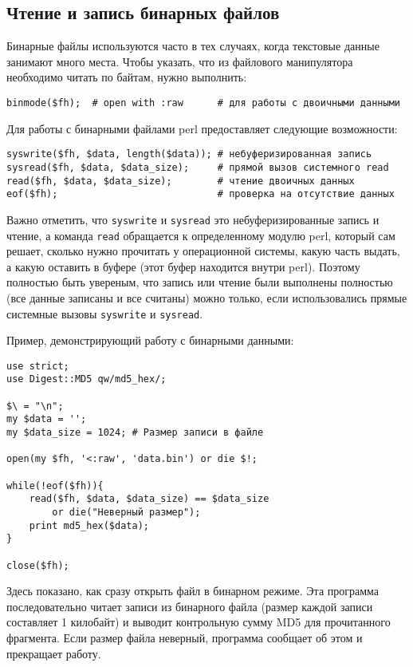 \subsection{Чтение и запись бинарных файлов}
Бинарные файлы используются часто в тех случаях, когда текстовые данные занимают много места. Чтобы указать, что из файлового манипулятора необходимо читать по байтам, нужно выполнить:
\begin{verbatim}
binmode($fh);  # open with :raw      # для работы с двоичными данными
\end{verbatim}
Для работы с бинарными файлами perl предоставляет следующие возможности:
\begin{verbatim}
syswrite($fh, $data, length($data)); # небуферизированная запись
sysread($fh, $data, $data_size);     # прямой вызов системного read
read($fh, $data, $data_size);        # чтение двоичных данных
eof($fh);                            # проверка на отсутствие данных
\end{verbatim}
Важно отметить, что \verb|syswrite| и \verb|sysread| это небуферизированные запись и чтение, а команда \verb|read| обращается к определенному модулю perl, который сам решает, сколько нужно прочитать у операционной системы, какую часть выдать, а какую оставить в буфере (этот буфер находится внутри perl). Поэтому полностью быть увереным, что запись или чтение были выполнены полностью (все данные записаны и все считаны) можно только, если использовались прямые системные вызовы \verb|syswrite| и \verb|sysread|.

Пример, демонстрирующий работу с бинарными данными:
\begin{verbatim}
use strict;
use Digest::MD5 qw/md5_hex/;

$\ = "\n";
my $data = '';
my $data_size = 1024; # Размер записи в файле

open(my $fh, '<:raw', 'data.bin') or die $!;

while(!eof($fh)){
    read($fh, $data, $data_size) == $data_size
        or die("Неверный размер");
    print md5_hex($data);
}

close($fh);
\end{verbatim}
Здесь показано, как сразу открыть файл в бинарном режиме. Эта программа последовательно читает записи из бинарного файла (размер каждой записи составляет 1 килобайт) и выводит контрольную сумму MD5 для прочитанного фрагмента. Если размер файла неверный, программа сообщает об этом и прекращает работу.

